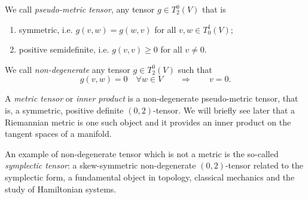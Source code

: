 \begin{definition}\label{def:metric}
	We call \emph{pseudo-metric tensor}, any tensor $g\in T_2^0(V)$ that is
	\begin{enumerate}
		\item symmetric, i.e. $g(v,w) = g(w,v)$ for all $v,w\in T_0^1(V)$;
		\item positive semidefinite, i.e. $g(v,v)\geq0$ for all $v\neq 0$.
	\end{enumerate}

	We call \emph{non-degenerate} any tensor $g\in T_2^0(V)$ such that
	\begin{equation}
		g(v,w) = 0 \quad\forall w\in V \qquad\Longrightarrow\qquad v=0.
	\end{equation}

	A \emph{metric tensor} or \emph{inner product} is a non-degenerate pseudo-metric tensor, that is, a symmetric, positive definite $(0,2)$-tensor.
	We will briefly see later that a Riemannian metric is one such object and it provides an inner product on the tangent spaces of a manifold.

	An example of non-degenerate tensor which is not a metric is the so-called \emph{symplectic tensor}: a skew-symmetric non-degenerate $(0,2)$-tensor related to the symplectic form, a fundamental object in topology, classical mechanics and the study of Hamiltonian systems.
\end{definition}

